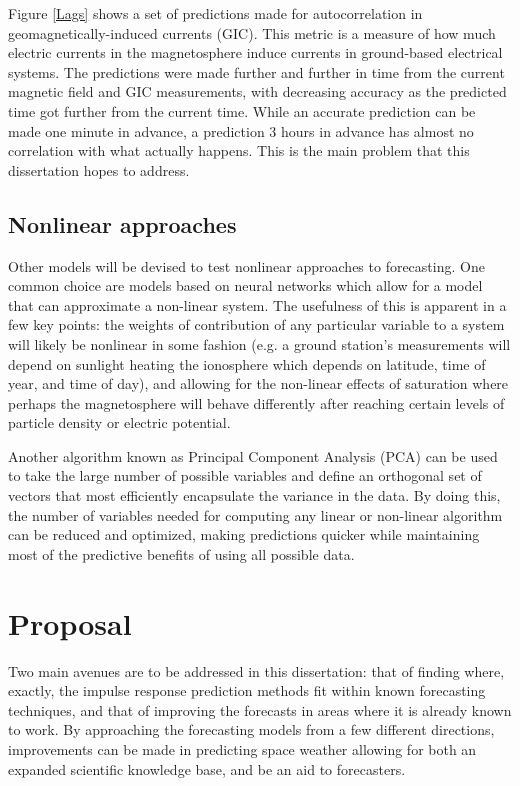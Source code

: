 \documentclass[10pt]{article}
\begin{document}
Figure \ref{Lags} shows a set of predictions made for autocorrelation in geomagnetically-induced currents (GIC). This metric is a measure of how much electric currents in the magnetosphere induce currents in ground-based electrical systems. The predictions were made further and further in time from the current magnetic field and GIC measurements, with decreasing accuracy as the predicted time got further from the current time. While an accurate prediction can be made one minute in advance, a prediction 3 hours in advance has almost no correlation with what actually happens. This is the main problem that this dissertation hopes to address.


\subsection{Nonlinear approaches}
Other models will be devised to test nonlinear approaches to forecasting. One common choice are models based on neural networks \citep{NNARMA,ANNforecast} which allow for a model that can approximate a non-linear system. The usefulness of this is apparent in a few key points: the weights of contribution of any particular variable to a system will likely be nonlinear in some fashion (e.g. a ground station's measurements will depend on sunlight heating the ionosphere which depends on latitude, time of year, and time of day), and allowing for the non-linear effects of saturation where perhaps the magnetosphere will behave differently after reaching certain levels of particle density or electric potential.

Another algorithm known as Principal Component Analysis (PCA) can be used to take the large number of possible variables and define an orthogonal set of vectors that most efficiently encapsulate the variance in the data. By doing this, the number of variables needed for computing any linear or non-linear algorithm can be reduced and optimized, making predictions quicker while maintaining most of the predictive benefits of using all possible data.


\section{Proposal}

Two main avenues are to be addressed in this dissertation: that of finding where, exactly, the impulse response prediction methods fit within known forecasting techniques, and that of improving the forecasts in areas where it is already known to work. By approaching the forecasting models from a few different directions, improvements can be made in predicting space weather allowing for both an expanded scientific knowledge base, and be an aid to forecasters.
\end{document}
